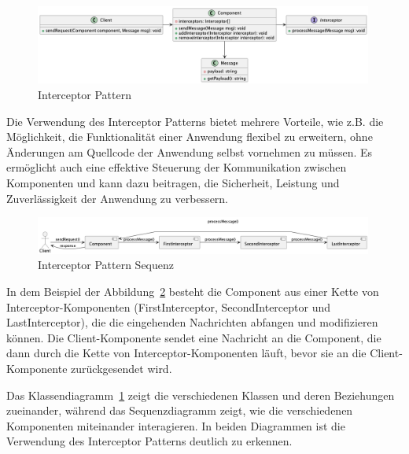 \documentclass[../vs-script-first-v01.tex]{subfiles}
\begin{document}
\begin{figure}[!ht]
  \centering
  \includegraphics[width=0.99\textwidth]{fig/uml/intercept-class.png}
  \caption{Interceptor Pattern}
  \label{fig:intercept-class}
\end{figure}

Die Verwendung des Interceptor Patterns bietet mehrere Vorteile, wie z.B. die Möglichkeit, die Funktionalität einer Anwendung flexibel zu erweitern, ohne Änderungen am Quellcode der Anwendung selbst vornehmen zu müssen. Es ermöglicht auch eine effektive Steuerung der Kommunikation zwischen Komponenten und kann dazu beitragen, die Sicherheit, Leistung und Zuverlässigkeit der Anwendung zu verbessern.

\begin{figure}[!ht]
  \centering
  \includegraphics[width=0.99\textwidth]{fig/uml/intercept-seq.png}
  \caption{Interceptor Pattern Sequenz}
  \label{fig:intercept-seq}
\end{figure}

In dem Beispiel der Abbildung~\ref{fig:intercept-seq} besteht die Component aus einer Kette von Interceptor-Komponenten (FirstInterceptor, SecondInterceptor und LastInterceptor), die die eingehenden Nachrichten abfangen und modifizieren können. Die Client-Komponente sendet eine Nachricht an die Component, die dann durch die Kette von Interceptor-Komponenten läuft, bevor sie an die Client-Komponente zurückgesendet wird.

Das Klassendiagramm~\ref{fig:intercept-class} zeigt die verschiedenen Klassen und deren Beziehungen zueinander, während das Sequenzdiagramm zeigt, wie die verschiedenen Komponenten miteinander interagieren. In beiden Diagrammen ist die Verwendung des Interceptor Patterns deutlich zu erkennen.
\end{document}
